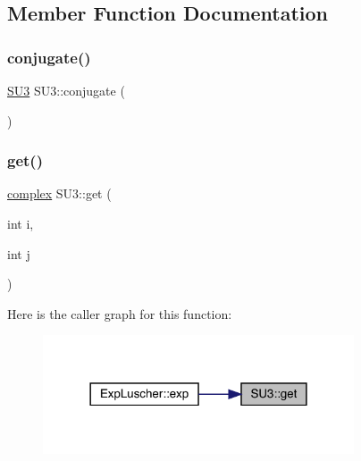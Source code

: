 \subsection{Member Function Documentation}
\mbox{\label{class_s_u3_a1db359a1ede38fcf858876292a8c9c43}} 
\subsubsection{\texorpdfstring{conjugate()}{conjugate()}}
{\footnotesize\ttfamily \mbox{\hyperlink{class_s_u3}{S\+U3}} S\+U3\+::conjugate (\begin{DoxyParamCaption}{ }\end{DoxyParamCaption})}

\mbox{\label{class_s_u3_aa0c34df7c067dcbb917d18cf587046a2}} 
\subsubsection{\texorpdfstring{get()}{get()}}
{\footnotesize\ttfamily \mbox{\hyperlink{classcomplex}{complex}} S\+U3\+::get (\begin{DoxyParamCaption}\item[{int}]{i,  }\item[{int}]{j }\end{DoxyParamCaption})\hspace{0.3cm}{\ttfamily [inline]}}

Here is the caller graph for this function\+:\nopagebreak
\begin{figure}[H]
\begin{center}
\leavevmode
\includegraphics[width=261pt]{class_s_u3_aa0c34df7c067dcbb917d18cf587046a2_icgraph}
\end{center}
\end{figure}
\mbox{\label{class_s_u3_af84aef1d34a4fdcda292200804eb1221}} 
